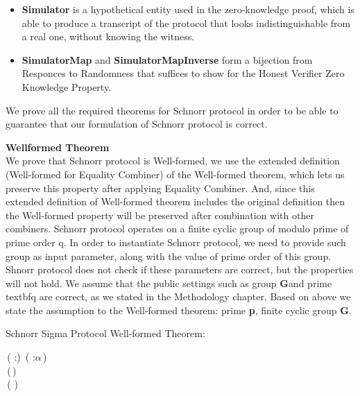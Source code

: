 \begin{itemize}
    \item \textbf{Simulator}  is a hypothetical entity used in the zero-knowledge proof, which is able to produce a transcript of the protocol that looks indistinguishable from a real one, without knowing the witness.
    \item \textbf{SimulatorMap} and \textbf{SimulatorMapInverse}  form a bijection from Responces to Randomness that suffices to show for the Honest Verifier Zero Knowledge Property.
\end{itemize}

We prove all the required theorems for Schnorr protocol in order to be able to guarantee that our formulation of Schnorr protocol is correct.

\textbf{Wellformed Theorem}\\
We prove that Schnorr protocol is Well-formed, we use the extended definition (Well-formed for Equality Combiner) of the Well-formed theorem, which lets us preserve this property after applying Equality Combiner. And, since this extended definition of Well-formed theorem includes the original definition then the Well-formed property will be preserved after combination with other combiners. 
Schnorr protocol operates on a finite cyclic group of modulo prime of prime order q. In order to instantiate Schnorr protocol, we need to provide such group as input parameter, along with the value of prime order of this group. Shnorr protocol does not check if these parameters are correct, but the properties will not hold. We assume that the public settings such as group \textbf{G}and prime textbf{q} are correct, as we stated in the Methodology chapter. Based on above we state the assumption to the Well-formed theorem: prime \textbf{p}, finite cyclic group \textbf{G}.

Schnorr Sigma Protocol Well-formed Theorem:
\begin{holmath}
    \,( :)\,\HOLSymConst{\HOLTokenConj{}}\,\,( :\ensuremath{\alpha}\,)\,\HOLSymConst{\HOLTokenConj{}}\,\,\,\HOLSymConst{\HOLTokenConj{}}\\
\,(\,)\,\HOLSymConst{=}\,\,\HOLSymConst{\HOLTokenImp{}}\\
\,(\,\,)
\end{holmath}  

